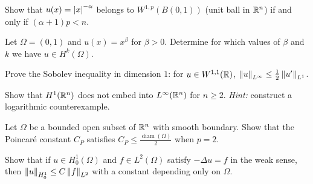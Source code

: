\begin{exercise}
Show that $u(x) = \left| x \right|^{-\alpha}$ belongs to $W^{1,p}(B(0,1))$ (unit ball in
$\mathbb{R}^n$) if and only if $(\alpha + 1)p < n$.
\end{exercise}

\begin{exercise}
Let $\Omega = (0,1)$ and $u(x) = x^\beta$ for $\beta > 0$. Determine for which
values of $\beta$ and $k$ we have $u \in H^k(\Omega)$.
\end{exercise}

\begin{exercise}
Prove the Sobolev inequality in dimension $1$: for $u \in W^{1,1}(\mathbb{R})$,
$\left\| u \right\|_{L^\infty} \leq \frac{1}{2}\left\| u' \right\|_{L^1}$.
\end{exercise}

\begin{exercise}
Show that $H^1(\mathbb{R}^n)$ does not embed into $L^\infty(\mathbb{R}^n)$ for $n \geq 2$.
\emph{Hint:} construct a logarithmic counterexample.
\end{exercise}

\begin{exercise}
Let $\Omega$ be a bounded open subset of $\mathbb{R}^n$ with smooth boundary. Show that
the Poincar\'e constant $C_P$ satisfies $C_P \leq \frac{\operatorname{diam}(\Omega)}{2}$
when $p = 2$.
\end{exercise}

\begin{exercise}
Show that if $u \in H^1_0(\Omega)$ and $f \in L^2(\Omega)$ satisfy $-\Delta u = f$
in the weak sense, then $\left\| u \right\|_{H^1_0} \leq C\left\| f \right\|_{L^2}$ with a constant
depending only on $\Omega$.
\end{exercise}

